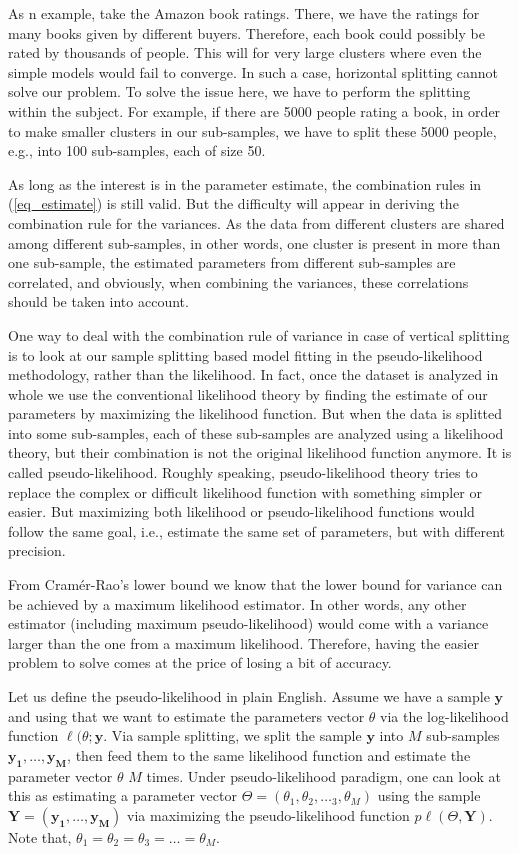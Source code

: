 \documentclass[11pt,a5paper,twoside]{book}
\begin{document}
As n example, take the Amazon book ratings. There, we have the ratings for many books given by different buyers. Therefore, each book could possibly be rated by thousands of people. This will for very large clusters where even the simple models would fail to converge. In such a case, horizontal splitting cannot solve our problem. To solve the issue here, we have to perform the splitting within the subject. For example, if there are 5000 people rating a book, in order to make smaller clusters in our sub-samples, we have to split these 5000 people, e.g., into 100 sub-samples, each of size 50. 

As long as the interest is in the parameter estimate, the combination rules in (\ref{eq_estimate}) is still valid. But the difficulty will appear in deriving the combination rule for the variances. As the data from different clusters are shared among different sub-samples, in other words, one cluster is present in more than one sub-sample, the estimated parameters from different sub-samples are correlated, and obviously, when combining the variances, these correlations should be taken into account. 

One way to deal with the combination rule of variance in case of vertical splitting is to look at our sample splitting based model fitting in the pseudo-likelihood methodology, rather than the likelihood. In fact, once the dataset is analyzed in whole we use the conventional likelihood theory by finding the estimate of our parameters by maximizing the likelihood function. But when the data is splitted into some sub-samples, each of these sub-samples are analyzed using a likelihood theory, but their combination is not the original likelihood function anymore. It is called pseudo-likelihood. Roughly speaking, pseudo-likelihood theory tries to replace the complex or difficult likelihood function with something simpler or easier. But maximizing both likelihood or pseudo-likelihood functions would follow the same goal, i.e., estimate the same set of parameters, but with different precision.

From Cram\'{e}r-Rao's lower bound we know that the lower bound for variance can be achieved by a maximum likelihood estimator. In other words, any other estimator (including maximum pseudo-likelihood) would come with a variance larger than the one from a maximum likelihood. Therefore, having the easier problem to solve comes at the price of losing a bit of accuracy. 

Let us define the pseudo-likelihood in plain English. Assume we have a sample $\mathbf{y}$ and using that we want to estimate the parameters vector $\theta$ via the log-likelihood function $\ell(\theta; \mathbf{y}$. Via sample splitting, we split the sample $\mathbf{y}$ into $M$ sub-samples $\mathbf{y_1}, \ldots, \mathbf{y_M}$, then feed them to the same likelihood function and estimate the parameter vector $\theta$ $M$ times. Under pseudo-likelihood paradigm, one can look at this as estimating a parameter vector $\Theta = (\theta_1, \theta_2, \ldots_3, \theta_M)$ using the sample $\mathbf{Y} = (\mathbf{y_1}, \ldots, \mathbf{y_M})$ via maximizing the pseudo-likelihood function $p\ell(\Theta, \mathbf{Y})$. Note that, $\theta_1 = \theta_2 = \theta_3 = \ldots = \theta_M$. 
\end{document}
